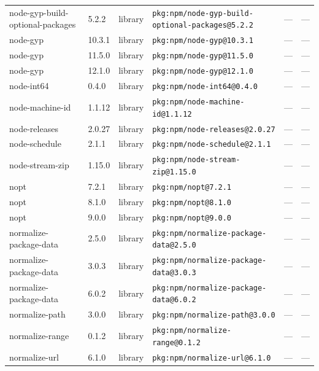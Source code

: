 \documentclass[11pt,a4paper]{article}
\begin{document}
\begin{longtable}{|p{4cm}|p{2cm}|p{1.6cm}|p{5cm}|p{1.5cm}|p{3.5cm}|}
\raggedright node-gyp-build-optional-packages & 5.2.2 & library & \small\texttt{pkg:npm/node-gyp-build-optional-packages@5.2.2} & — & \small — \\
\raggedright node-gyp & 10.3.1 & library & \small\texttt{pkg:npm/node-gyp@10.3.1} & — & \small — \\
\raggedright node-gyp & 11.5.0 & library & \small\texttt{pkg:npm/node-gyp@11.5.0} & — & \small — \\
\raggedright node-gyp & 12.1.0 & library & \small\texttt{pkg:npm/node-gyp@12.1.0} & — & \small — \\
\raggedright node-int64 & 0.4.0 & library & \small\texttt{pkg:npm/node-int64@0.4.0} & — & \small — \\
\raggedright node-machine-id & 1.1.12 & library & \small\texttt{pkg:npm/node-machine-id@1.1.12} & — & \small — \\
\raggedright node-releases & 2.0.27 & library & \small\texttt{pkg:npm/node-releases@2.0.27} & — & \small — \\
\raggedright node-schedule & 2.1.1 & library & \small\texttt{pkg:npm/node-schedule@2.1.1} & — & \small — \\
\raggedright node-stream-zip & 1.15.0 & library & \small\texttt{pkg:npm/node-stream-zip@1.15.0} & — & \small — \\
\raggedright nopt & 7.2.1 & library & \small\texttt{pkg:npm/nopt@7.2.1} & — & \small — \\
\raggedright nopt & 8.1.0 & library & \small\texttt{pkg:npm/nopt@8.1.0} & — & \small — \\
\raggedright nopt & 9.0.0 & library & \small\texttt{pkg:npm/nopt@9.0.0} & — & \small — \\
\raggedright normalize-package-data & 2.5.0 & library & \small\texttt{pkg:npm/normalize-package-data@2.5.0} & — & \small — \\
\raggedright normalize-package-data & 3.0.3 & library & \small\texttt{pkg:npm/normalize-package-data@3.0.3} & — & \small — \\
\raggedright normalize-package-data & 6.0.2 & library & \small\texttt{pkg:npm/normalize-package-data@6.0.2} & — & \small — \\
\raggedright normalize-path & 3.0.0 & library & \small\texttt{pkg:npm/normalize-path@3.0.0} & — & \small — \\
\raggedright normalize-range & 0.1.2 & library & \small\texttt{pkg:npm/normalize-range@0.1.2} & — & \small — \\
\raggedright normalize-url & 6.1.0 & library & \small\texttt{pkg:npm/normalize-url@6.1.0} & — & \small — \\

\end{longtable}
\end{document}
